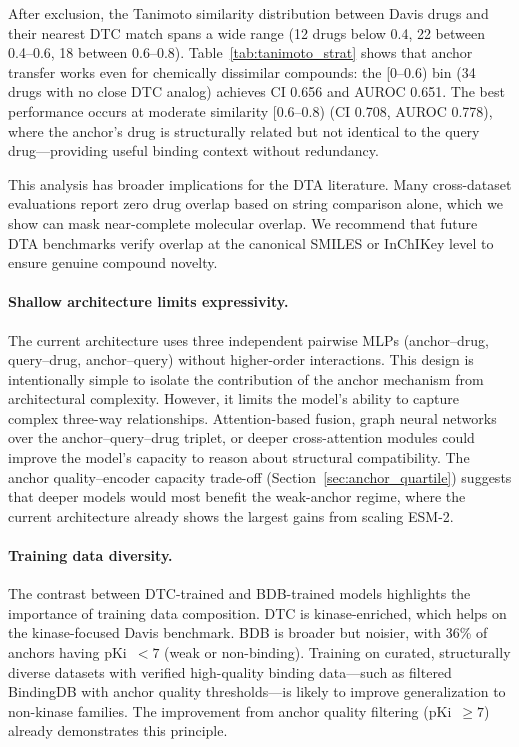 After exclusion, the Tanimoto similarity distribution between Davis drugs and their nearest DTC match spans a wide range (12 drugs below 0.4, 22 between 0.4--0.6, 18 between 0.6--0.8). Table~\ref{tab:tanimoto_strat} shows that anchor transfer works even for chemically dissimilar compounds: the [0--0.6) bin (34 drugs with no close DTC analog) achieves CI 0.656 and AUROC 0.651. The best performance occurs at moderate similarity [0.6--0.8) (CI 0.708, AUROC 0.778), where the anchor's drug is structurally related but not identical to the query drug---providing useful binding context without redundancy.

This analysis has broader implications for the DTA literature. Many cross-dataset evaluations report zero drug overlap based on string comparison alone, which we show can mask near-complete molecular overlap. We recommend that future DTA benchmarks verify overlap at the canonical SMILES or InChIKey level to ensure genuine compound novelty.

\paragraph{Shallow architecture limits expressivity.}
The current architecture uses three independent pairwise MLPs (anchor--drug, query--drug, anchor--query) without higher-order interactions. This design is intentionally simple to isolate the contribution of the anchor mechanism from architectural complexity. However, it limits the model's ability to capture complex three-way relationships. Attention-based fusion, graph neural networks over the anchor--query--drug triplet, or deeper cross-attention modules could improve the model's capacity to reason about structural compatibility. The anchor quality--encoder capacity trade-off (Section~\ref{sec:anchor_quartile}) suggests that deeper models would most benefit the weak-anchor regime, where the current architecture already shows the largest gains from scaling ESM-2.

\paragraph{Training data diversity.}
The contrast between DTC-trained and BDB-trained models highlights the importance of training data composition. DTC is kinase-enriched, which helps on the kinase-focused Davis benchmark. BDB is broader but noisier, with 36\% of anchors having pKi~$< 7$ (weak or non-binding). Training on curated, structurally diverse datasets with verified high-quality binding data---such as filtered BindingDB with anchor quality thresholds---is likely to improve generalization to non-kinase families. The improvement from anchor quality filtering (pKi~$\geq 7$) already demonstrates this principle.

